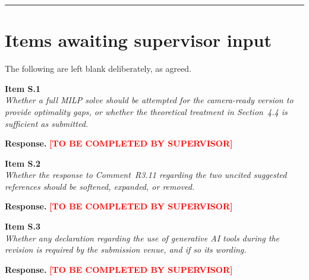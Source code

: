 \documentclass[11pt,a4paper]{article}
\newcommand{\rpending}{\vspace{2pt}\noindent\textbf{Response.}
  \textcolor{red}{\textbf{[TO BE COMPLETED BY SUPERVISOR]}}\par\vspace{10pt}}
\newenvironment{revcomment}[1]
  {\begin{tcolorbox}[colback=gray!6,colframe=gray!45,boxrule=0.4pt,
     left=6pt,right=6pt,top=4pt,bottom=4pt]\textbf{#1}\\[2pt]\itshape\color{cmt}}
  {\end{tcolorbox}\vspace{4pt}}
\begin{document}
\bigskip
\hrule
\bigskip

\section*{Items awaiting supervisor input}
The following are left blank deliberately, as agreed.

\begin{revcomment}{Item S.1}
Whether a full MILP solve should be attempted for the camera-ready version to
provide optimality gaps, or whether the theoretical treatment in Section~4.4 is
sufficient as submitted.
\end{revcomment}
\rpending

\begin{revcomment}{Item S.2}
Whether the response to Comment~R3.11 regarding the two uncited suggested
references should be softened, expanded, or removed.
\end{revcomment}
\rpending

\begin{revcomment}{Item S.3}
Whether any declaration regarding the use of generative AI tools during the
revision is required by the submission venue, and if so its wording.
\end{revcomment}
\rpending
\end{document}
